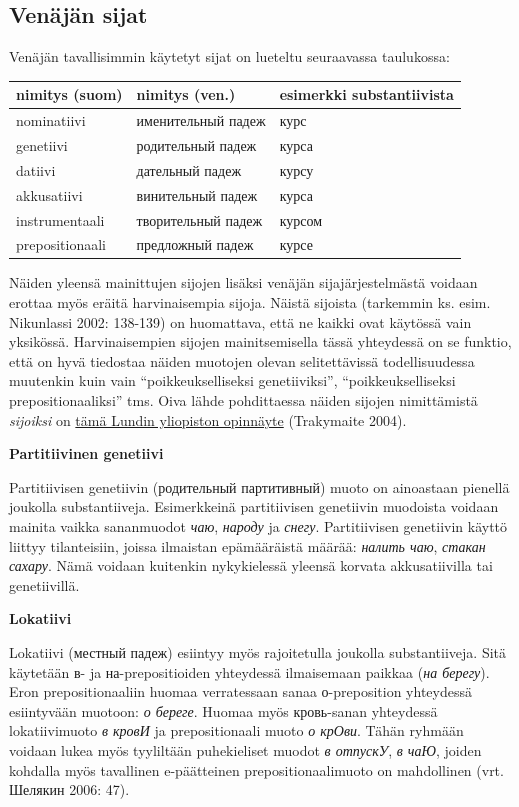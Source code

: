 \documentclass[]{scrartcl}
\begin{document}
\subsection{Venäjän sijat}\label{venuxe4juxe4n-sijat}

Venäjän tavallisimmin käytetyt sijat on lueteltu seuraavassa taulukossa:

\begin{longtable}[c]{@{}lll@{}}
\toprule
nimitys (suom) & nimitys (ven.) & esimerkki
substantiivista\tabularnewline
\midrule
\endhead
nominatiivi & именительный падеж & курс\tabularnewline
genetiivi & родительный падеж & курса\tabularnewline
datiivi & дательный падеж & курсу\tabularnewline
akkusatiivi & винительный падеж & курса\tabularnewline
instrumentaali & творительный падеж & курсом\tabularnewline
prepositionaali & предложный падеж & курсе\tabularnewline
\bottomrule
\end{longtable}

Näiden yleensä mainittujen sijojen lisäksi venäjän sijajärjestelmästä
voidaan erottaa myös eräitä harvinaisempia sijoja. Näistä sijoista
(tarkemmin ks. esim. Nikunlassi 2002: 138-139) on huomattava, että ne
kaikki ovat käytössä vain yksikössä. Harvinaisempien sijojen
mainitsemisella tässä yhteydessä on se funktio, että on hyvä tiedostaa
näiden muotojen olevan selitettävissä todellisuudessa muutenkin kuin
vain ``poikkeukselliseksi genetiiviksi'', ``poikkeukselliseksi
prepositionaaliksi'' tms. Oiva lähde pohdittaessa näiden sijojen
nimittämistä \emph{sijoiksi} on
\href{http://lup.lub.lu.se/luur/download?func=downloadFile\&recordOId=3810042\&fileOId=3810043}{tämä
Lundin yliopiston opinnäyte} (Trakymaite 2004).

\textbf{Partitiivinen genetiivi}

Partitiivisen genetiivin (родительный партитивный) muoto on ainoastaan
pienellä joukolla substantiiveja. Esimerkkeinä partitiivisen genetiivin
muodoista voidaan mainita vaikka sananmuodot \emph{чаю}, \emph{народу}
ja \emph{снегу}. Partitiivisen genetiivin käyttö liittyy tilanteisiin,
joissa ilmaistan epämääräistä määrää: \emph{налить чаю}, \emph{стакан
сахару}. Nämä voidaan kuitenkin nykykielessä yleensä korvata
akkusatiivilla tai genetiivillä.

\textbf{Lokatiivi}

Lokatiivi (местный падеж) esiintyy myös rajoitetulla joukolla
substantiiveja. Sitä käytetään в- ja на-prepositioiden yhteydessä
ilmaisemaan paikkaa (\emph{на берегу}). Eron prepositionaaliin huomaa
verratessaan sanaa о-preposition yhteydessä esiintyvään muotoon: \emph{о
береге}. Huomaa myös кровь-sanan yhteydessä lokatiivimuoto \emph{в
кровИ} ja prepositionaali muoto \emph{о крОви}. Tähän ryhmään voidaan
lukea myös tyyliltään puhekieliset muodot \emph{в отпускУ}, \emph{в
чаЮ}, joiden kohdalla myös tavallinen e-päätteinen prepositionaalimuoto
on mahdollinen (vrt. Шелякин 2006: 47).
\end{document}
